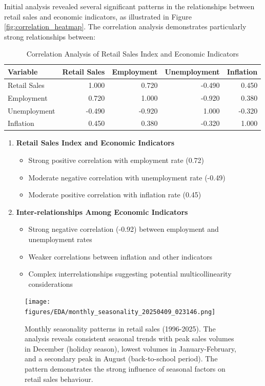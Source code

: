 \documentclass[12pt,a4paper]{report}
\begin{document}
Initial analysis revealed several significant patterns in the relationships between retail sales and economic indicators, as illustrated in Figure \ref{fig:correlation_heatmap}. The correlation analysis demonstrates particularly strong relationships between:

\begin{table}[htbp]
\centering
\caption{Correlation Analysis of Retail Sales Index and Economic Indicators}
\label{tab:correlation_analysis}
\begin{tabular}{lrrrr}
\toprule
Variable & Retail Sales & Employment & Unemployment & Inflation \\
\midrule
Retail Sales & 1.000 & 0.720 & -0.490 & 0.450 \\
Employment & 0.720 & 1.000 & -0.920 & 0.380 \\
Unemployment & -0.490 & -0.920 & 1.000 & -0.320 \\
Inflation & 0.450 & 0.380 & -0.320 & 1.000 \\
\bottomrule
\end{tabular}
\end{table}

\begin{enumerate}
    \item \textbf{Retail Sales Index and Economic Indicators}
    \begin{itemize}
        \item Strong positive correlation with employment rate (0.72)
        \item Moderate negative correlation with unemployment rate (-0.49)
        \item Moderate positive correlation with inflation rate (0.45)
    \end{itemize}

    \item \textbf{Inter-relationships Among Economic Indicators}
    \begin{itemize}
        \item Strong negative correlation (-0.92) between employment and unemployment rates
        \item Weaker correlations between inflation and other indicators
        \item Complex interrelationships suggesting potential multicollinearity considerations
    \end{itemize}
\end{enumerate}

\begin{figure}[htbp]
\centering
\texttt{[image: figures/EDA/monthly\_seasonality\_20250409\_023146.png]}
\caption{Monthly seasonality patterns in retail sales (1996-2025). The analysis reveals consistent seasonal trends with peak sales volumes in December (holiday season), lowest volumes in January-February, and a secondary peak in August (back-to-school period). The pattern demonstrates the strong influence of seasonal factors on retail sales behaviour.}
\label{fig:monthly_seasonality}
\end{figure}
\end{document}
